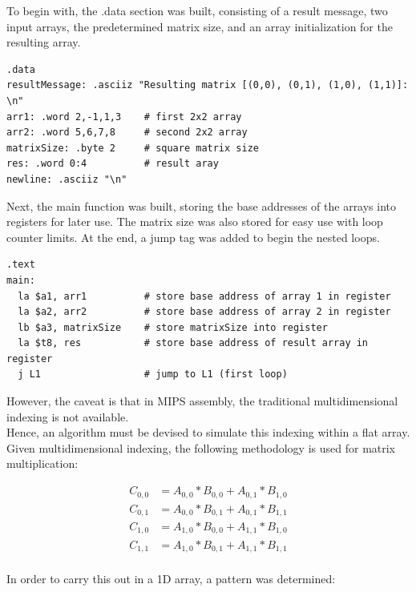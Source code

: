 \documentclass[twocolumn]{article}
\begin{document}
To begin with, the .data section was built, consisting of a result message, two input arrays, the predetermined matrix size, and an array initialization for the resulting array. 

\begin{verbatim}
.data
resultMessage: .asciiz "Resulting matrix [(0,0), (0,1), (1,0), (1,1)]: \n"
arr1: .word 2,-1,1,3    # first 2x2 array
arr2: .word 5,6,7,8     # second 2x2 array
matrixSize: .byte 2     # square matrix size
res: .word 0:4          # result aray
newline: .asciiz "\n"
\end{verbatim} 

Next, the main function was built, storing the base addresses of the arrays into registers for later use. The matrix size was also stored for easy use with loop counter limits. At the end, a jump tag was added to begin the nested loops.

\begin{verbatim}
.text
main:
  la $a1, arr1          # store base address of array 1 in register
  la $a2, arr2          # store base address of array 2 in register
  lb $a3, matrixSize    # store matrixSize into register
  la $t8, res           # store base address of result array in register
  j L1                  # jump to L1 (first loop)
\end{verbatim}

However, the caveat is that in MIPS assembly, the traditional multidimensional indexing is not available. \\

Hence, an algorithm must be devised to simulate this indexing within a flat array. \\

Given multidimensional indexing, the following methodology is used for matrix multiplication: 

\begin{equation}
    \begin{split}
        C_{0,0} & = A_{0,0}*B_{0,0} + A_{0,1}*B_{1,0} \\
        C_{0,1} & = A_{0,0}*B_{0,1} + A_{0,1}*B_{1,1} \\
        C_{1,0} & = A_{1,0}*B_{0,0} + A_{1,1}*B_{1,0} \\
        C_{1,1} & = A_{1,0}*B_{0,1} + A_{1,1}*B_{1,1} \\
    \end{split}
\end{equation}

In order to carry this out in a 1D array, a pattern was determined:
\end{document}
